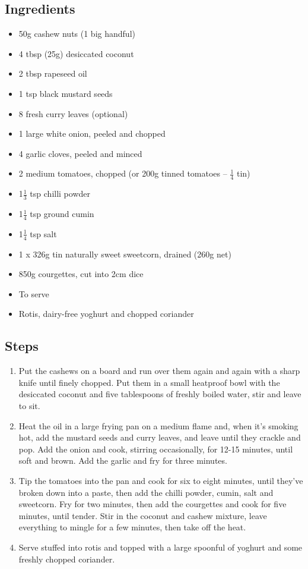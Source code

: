 \documentclass{book}
\begin{document}
\subsection*{Ingredients}
\begin{itemize}
\item 50g cashew nuts (1 big handful)
\item 4 tbsp (25g) desiccated coconut 
\item 2 tbsp rapeseed oil
\item 1 tsp black mustard seeds 
\item 8 fresh curry leaves (optional) 
\item 1 large white onion, peeled and chopped 
\item 4 garlic cloves, peeled and minced 
\item 2 medium tomatoes, chopped (or 200g tinned tomatoes – $\frac{1}{4}$ tin)
\item 1$\frac{1}{3}$ tsp chilli powder
\item 1$\frac{1}{4}$ tsp ground cumin
\item 1$\frac{1}{4}$ tsp salt
\item 1 x 326g tin naturally sweet sweetcorn, drained (260g net)
\item 850g courgettes, cut into 2cm dice
\end{itemize}

\begin{itemize}
\item To serve
\item Rotis, dairy-free yoghurt and chopped coriander
\end{itemize}

\subsection*{Steps}
\begin{enumerate}
\item Put the cashews on a board and run over them again and again with a sharp knife until finely chopped. Put them in a small heatproof bowl with the desiccated coconut and five tablespoons of freshly boiled water, stir and leave to sit.
\item Heat the oil in a large frying pan on a medium flame and, when it’s smoking hot, add the mustard seeds and curry leaves, and leave until they crackle and pop. Add the onion and cook, stirring occasionally, for 12-15 minutes, until soft and brown. Add the garlic and fry for three minutes.
\item Tip the tomatoes into the pan and cook for six to eight minutes, until they’ve broken down into a paste, then add the chilli powder, cumin, salt and sweetcorn. Fry for two minutes, then add the courgettes and cook for five minutes, until tender. Stir in the coconut and cashew mixture, leave everything to mingle for a few minutes, then take off the heat.
\item Serve stuffed into rotis and topped with a large spoonful of yoghurt and some freshly chopped coriander.
\end{enumerate}
\newpage
\end{document}
